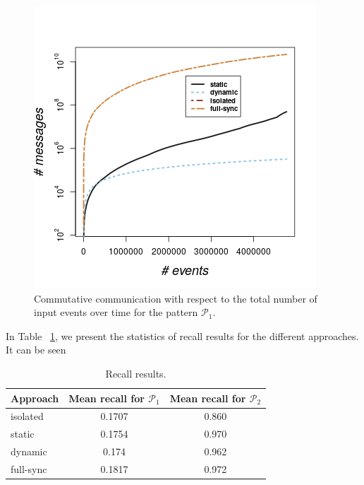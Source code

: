 \begin{figure}[]
	
	\includegraphics[width=.5\textwidth]{figures/communication.png}
	
	\caption{Commutative communication with respect to the total number of input events over time for the pattern $\mathcal{P}_1$.}
	\label{fig:comm}
\end{figure}


\par In Table ~\ref{tab:recall}, we present the statistics of recall results for the different approaches. It can be seen 

\begin{table}[]
	\caption{Recall results.}
	\label{tab:recall}
	\begin{tabular}{lcc}
		\toprule
		Approach &Mean recall for $\mathcal{P}_1$ &Mean recall for $\mathcal{P}_2$\\
		\midrule
		isolated & 0.1707  & 0.860 \\
		static & 0.1754  &  0.970 \\
		dynamic & 0.174  & 0.962 \\
		full-sync & 0.1817  & 0.972 \\
		\bottomrule
	\end{tabular}
\end{table}


 
